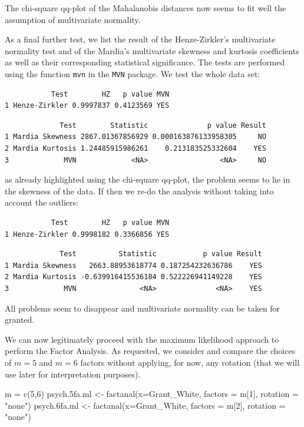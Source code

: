 \documentclass[
  letterpaper,
  DIV=11,
  numbers=noendperiod]{scrartcl}
\newenvironment{Shaded}{\begin{snugshade}}{\end{snugshade}}
\newcommand{\AttributeTok}[1]{\textcolor[rgb]{0.40,0.45,0.13}{#1}}
\newcommand{\DecValTok}[1]{\textcolor[rgb]{0.68,0.00,0.00}{#1}}
\newcommand{\FloatTok}[1]{\textcolor[rgb]{0.68,0.00,0.00}{#1}}
\newcommand{\FunctionTok}[1]{\textcolor[rgb]{0.28,0.35,0.67}{#1}}
\newcommand{\NormalTok}[1]{\textcolor[rgb]{0.00,0.23,0.31}{#1}}
\newcommand{\OtherTok}[1]{\textcolor[rgb]{0.00,0.23,0.31}{#1}}
\newcommand{\StringTok}[1]{\textcolor[rgb]{0.13,0.47,0.30}{#1}}
\begin{document}
The chi-square qq-plot of the Mahalanobis distances now seems to fit
well the assumption of multivariate normality.

As a final further test, we list the result of the Henze-Zirkler's
multivariate normality test and of the Mardia's multivariate skewness
and kurtosis coefficients as well as their corresponding statistical
significance. The tests are performed using the function \texttt{mvn} in
the \texttt{MVN} package. We test the whole data set:

\begin{verbatim}
           Test        HZ   p value MVN
1 Henze-Zirkler 0.9997837 0.4123569 YES
\end{verbatim}

\begin{verbatim}
             Test        Statistic              p value Result
1 Mardia Skewness 2867.01367856929 0.000163876133958305     NO
2 Mardia Kurtosis 1.24485915986261    0.213183525332604    YES
3             MVN             <NA>                 <NA>     NO
\end{verbatim}

as already highlighted using the chi-square qq-plot, the problem seems
to lie in the skewness of the data. If then we re-do the analysis
without taking into account the outliers:

\begin{verbatim}
           Test        HZ   p value MVN
1 Henze-Zirkler 0.9998182 0.3366856 YES
\end{verbatim}

\begin{verbatim}
             Test          Statistic           p value Result
1 Mardia Skewness   2663.88953618774 0.187254232636786    YES
2 Mardia Kurtosis -0.639916415536184 0.522226941149228    YES
3             MVN               <NA>              <NA>    YES
\end{verbatim}

All problems seem to disappear and multivariate normality can be taken
for granted.

We can now legitimately proceed with the maximum likelihood approach to
perform the Factor Analysis. As requested, we consider and compare the
choices of \(m=5\) and \(m=6\) factors without applying, for now, any
rotation (that we will use later for interpretation purposes).

\begin{Shaded}
\begin{Highlighting}[]
\NormalTok{m }\OtherTok{=} \FunctionTok{c}\NormalTok{(}\DecValTok{5}\NormalTok{,}\DecValTok{6}\NormalTok{)}
\NormalTok{psych}\FloatTok{.5}\NormalTok{fa.ml }\OtherTok{\textless{}{-}} \FunctionTok{factanal}\NormalTok{(}\AttributeTok{x=}\NormalTok{Grant\_White, }\AttributeTok{factors =}\NormalTok{ m[}\DecValTok{1}\NormalTok{], }\AttributeTok{rotation =} \StringTok{"none"}\NormalTok{)}
\NormalTok{psych}\FloatTok{.6}\NormalTok{fa.ml }\OtherTok{\textless{}{-}} \FunctionTok{factanal}\NormalTok{(}\AttributeTok{x=}\NormalTok{Grant\_White, }\AttributeTok{factors =}\NormalTok{ m[}\DecValTok{2}\NormalTok{], }\AttributeTok{rotation =} \StringTok{"none"}\NormalTok{)}
\end{Highlighting}
\end{Shaded}
\end{document}
